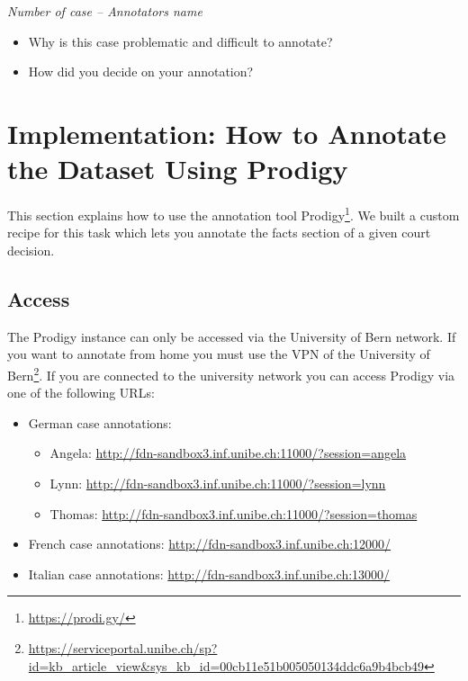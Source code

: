 \documentclass{article}
\begin{document}
\begin{mdframed}[frametitle={Comment for generally problematic case}]
\emph{Number of case – Annotators name}

\begin{itemize}
	\item Why is this case problematic and difficult to annotate?

\item How did you decide on your annotation?
\end{itemize}
\end{mdframed}

\section{Implementation: How to Annotate the Dataset Using Prodigy}
This section explains how to use the annotation tool Prodigy\footnote{\href{https://prodi.gy/}{https://prodi.gy/}}. We built a custom recipe for this task which lets you annotate the facts section of a given court decision.

\subsection{Access}
The Prodigy instance can only be accessed via the University of Bern network. If you want to annotate from home you must use the VPN of the University of Bern\footnote{\href{https://serviceportal.unibe.ch/sp?id=kb_article_view&sys_kb_id=00cb11e51b005050134ddc6a9b4bcb49}{https://serviceportal.unibe.ch/sp?id=kb_article_view&sys_kb_id=00cb11e51b005050134ddc6a9b4bcb49}}.
If you are connected to the university network you can access Prodigy via one of the following URLs:
\begin{itemize}
\item German case annotations:
\begin{itemize}
\item Angela: \href{http://fdn-sandbox3.inf.unibe.ch:11000/?session=angela}{http://fdn-sandbox3.inf.unibe.ch:11000/?session=angela}
    \item Lynn: \href{http://fdn-sandbox3.inf.unibe.ch:11000/?session=lynn}{http://fdn-sandbox3.inf.unibe.ch:11000/?session=lynn}
    \item Thomas: \href{http://fdn-sandbox3.inf.unibe.ch:11000/?session=thomas}{http://fdn-sandbox3.inf.unibe.ch:11000/?session=thomas}
\end{itemize}
    \item French case annotations: \href{http://fdn-sandbox3.inf.unibe.ch:12000/}{http://fdn-sandbox3.inf.unibe.ch:12000/}
    \item Italian case annotations: \href{http://fdn-sandbox3.inf.unibe.ch:13000/}{http://fdn-sandbox3.inf.unibe.ch:13000/}
\end{itemize}
\end{document}
